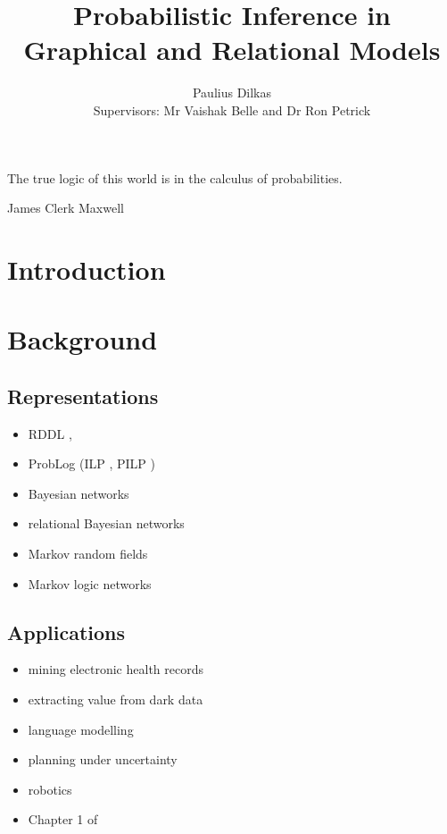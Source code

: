 \documentclass{article}
\title{Probabilistic Inference in Graphical and Relational Models}
\author{Paulius Dilkas \\[1ex] {\small Supervisors: Mr Vaishak Belle and Dr Ron
    Petrick}}
\affil{School of Informatics, University of Edinburgh}
\begin{document}
\maketitle

\epigraph{The true logic of this world is in the calculus of
  probabilities.}{James Clerk Maxwell}

\section{Introduction}

\section{Background} %

\subsection{Representations}

\begin{itemize}
\item RDDL \cite{sanner2010relational},
\item ProbLog \cite{DBLP:conf/ijcai/RaedtKT07} (ILP
  \cite{DBLP:journals/ngc/Muggleton91}, PILP \cite{DBLP:conf/ilp/2008p})
\item Bayesian networks \cite{pearl1985bayesian}
\item relational Bayesian networks \cite{DBLP:conf/uai/Jaeger97}
\item Markov random fields \cite{kindermann1980markov}
\item Markov logic networks \cite{DBLP:journals/ml/RichardsonD06}
\end{itemize}

\subsection{Applications}

\begin{itemize}
\item mining electronic health records \cite{DBLP:conf/iaai/NatarajanKIJC13}
\item extracting value from dark data
  \cite{DBLP:journals/ijswis/NiuZRS12,DBLP:conf/emnlp/VenugopalCGN14}
\item language modelling \cite{DBLP:conf/icml/JerniteRS15}
\item planning under uncertainty \cite{DBLP:journals/jair/BoutilierDH99}
\item robotics \cite{DBLP:journals/ras/BeetzJMT10}
\item Chapter 1 of \cite{DBLP:series/synthesis/2016Raedt}
\end{itemize}
\end{document}
